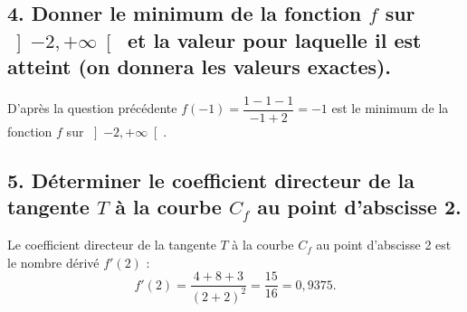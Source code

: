 \documentclass[10pt]{article}
\begin{document}
	\subsection*{4. Donner le minimum de la fonction \(f\) sur \(\left] -2, +\infty \right[\) et la valeur pour laquelle il est atteint (on donnera les valeurs exactes).}
	
	D’après la question précédente \(f(-1) = \dfrac{1 - 1 - 1}{-1 + 2} = -1\) est le minimum de la fonction \(f\) sur \(\left] -2, +\infty \right[\).
	
	\subsection*{5. Déterminer le coefficient directeur de la tangente \(T\) à la courbe \(C_f\) au point d’abscisse 2.}
	
	Le coefficient directeur de la tangente \(T\) à la courbe \(C_f\) au point d’abscisse 2 est le nombre dérivé \(f'(2)\) :
	\[ f'(2) = \dfrac{4 + 8 + 3}{(2 + 2)^2} = \dfrac{15}{16} = 0,9375. \]
\end{document}
